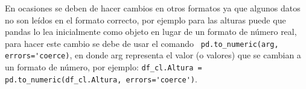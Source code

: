 En ocasiones se deben de hacer cambios en otros formatos ya que algunos datos no son leídos en el formato correcto, por ejemplo para las alturas puede que pandas lo lea inicialmente como objeto en lugar de un formato de número real, para hacer este cambio se debe de usar el comando \verb# pd.to_numeric(arg, errors='coerce)#, en donde arg representa el valor (o valores) que se cambian a un formato de número, por ejemplo: \verb#df_cl.Altura = pd.to_numeric(df_cl.Altura, errors='coerce')#.
\newpage



